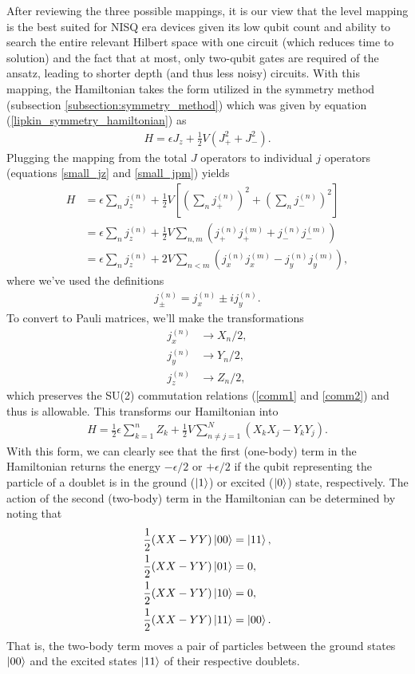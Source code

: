 \documentclass[10pt]{article}
\begin{document}
After reviewing the three possible mappings, it is our view that the level mapping \cite{ref:lipkin_naive} is the best suited for NISQ era devices given its low qubit count and ability to search the entire relevant Hilbert space with one circuit (which reduces time to solution) and the fact that at most, only two-qubit gates are required of the ansatz, leading to shorter depth (and thus less noisy) circuits. With this mapping, the Hamiltonian takes the form utilized in the symmetry method (subsection \ref{subsection:symmetry_method}) which was given by equation (\ref{lipkin_symmetry_hamiltonian}) as
\begin{align}
H
=
\epsilon J_z + \frac{1}{2}V(J^2_++J^2_-).
\end{align}
Plugging the mapping from the total $J$ operators to individual $j$ operators (equations \ref{small_jz} and \ref{small_jpm}) yields
\begin{align}
H
&=
\epsilon\sum_{n}j_z^{(n)} + \frac{1}{2}V\left[\left(\sum_nj^{(n)}_{+}\right)^2+\left(\sum_nj^{(n)}_{-}\right)^2\right]
\\
&=
\epsilon\sum_{n}j_z^{(n)} + \frac{1}{2}V\sum_{n,m}\left(j^{(n)}_+j^{(m)}_++j^{(n)}_-j^{(m)}_-\right)
\\
&=
\epsilon\sum_{n}j_z^{(n)} + 
2V\sum_{n<m}\left(j^{(n)}_xj^{(m)}_x-j^{(n)}_yj^{(m)}_y\right),
\end{align}
where we've used the definitions
\begin{align}
j_{\pm}^{(n)}=j_x^{(n)}\pm ij_y^{(n)}.
\end{align}
To convert to Pauli matrices, we'll make the transformations
\begin{align}
j_x^{(n)} &\to X_n/2,
\\
j_y^{(n)} &\to Y_n/2,
\\
j_z^{(n)} &\to Z_n/2,
\end{align}
which preserves the SU(2) commutation relations (\ref{comm1} and \ref{comm2}) and thus is allowable. This transforms our Hamiltonian into
\begin{align}
H=\frac{1}{2}\epsilon\sum_{k=1}^nZ_k+\frac{1}{2}V\sum_{n\neq j=1}^N(X_kX_j-Y_kY_j).
\end{align}
With this form, we can clearly see that the first (one-body) term in the Hamiltonian returns the energy $-\epsilon/2$ or $+\epsilon/2$ if the qubit representing the particle of a doublet is in the ground ($\ket{1}$) or excited ($\ket{0}$) state, respectively. The action of the second (two-body) term in the Hamiltonian can be determined by noting that
\begin{align}
\frac{1}{2}(XX-YY)\ket{00} &= \ket{11},
\\
\frac{1}{2}(XX-YY)\ket{01} &= 0,
\\
\frac{1}{2}(XX-YY)\ket{10} &= 0,
\\
\frac{1}{2}(XX-YY)\ket{11} &= \ket{00}.
\end{align}
That is, the two-body term moves a pair of particles between the ground states $\ket{00}$ and the excited states $\ket{11}$ of their respective doublets.  
\end{document}
